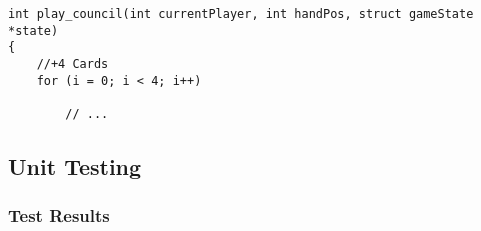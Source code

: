 \documentclass[11pt]{article}
\begin{document}
\begin{verbatim}
int play_council(int currentPlayer, int handPos, struct gameState *state)
{
    //+4 Cards
    for (i = 0; i < 4; i++)

        // ...
\end{verbatim}


\subsection{Unit Testing}
\label{sec:unittesting}

\subsubsection{Test Results}
\label{sec:testresults}
\end{document}
